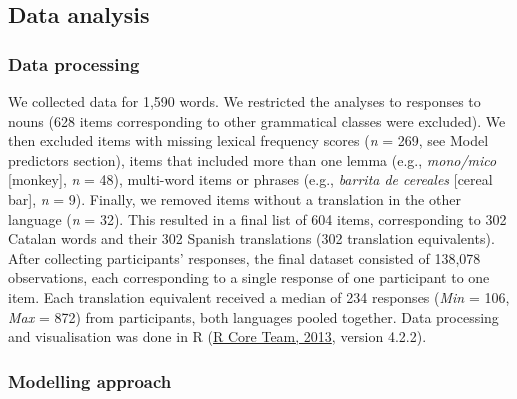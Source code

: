 \documentclass[
]{article}
\begin{document}
\hypertarget{sec-analysis}{%
\subsection{Data analysis}\label{sec-analysis}}

\hypertarget{data-processing}{%
\subsubsection{Data processing}\label{data-processing}}

We collected data for 1,590 words. We restricted the analyses to
responses to nouns (628 items corresponding to other grammatical classes
were excluded). We then excluded items with missing lexical frequency
scores (\emph{n} = 269, see Model predictors section), items that
included more than one lemma (e.g., \emph{mono/mico} {[}monkey{]},
\emph{n} = 48), multi-word items or phrases (e.g., \emph{barrita de
cereales} {[}cereal bar{]}, \emph{n} = 9). Finally, we removed items
without a translation in the other language (\emph{n} = 32). This
resulted in a final list of 604 items, corresponding to 302 Catalan
words and their 302 Spanish translations (302 translation equivalents).
After collecting participants' responses, the final dataset consisted of
138,078 observations, each corresponding to a single response of one
participant to one item. Each translation equivalent received a median
of 234 responses (\emph{Min} = 106, \emph{Max} = 872) from participants,
both languages pooled together. Data processing and visualisation was
done in R (\protect\hyperlink{ref-rcoreteam2013language}{R Core Team,
2013}, version 4.2.2).

\hypertarget{modelling-approach}{%
\subsubsection{Modelling approach}\label{modelling-approach}}
\end{document}
